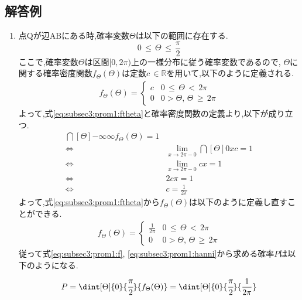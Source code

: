 \documentclass[dvipdfmx,titlepage, 11pt, a4paper]{jsarticle}%
\begin{document}
\newpage

\subsection{解答例}
\begin{enumerate}[(1)]
  \setlength{\itemsep}{10pt}
\item 点$\mathrm{Q}$が辺$\mathrm{AB}$にある時,確率変数$\Theta$は以下の範囲に存在する.
  \begin{equation}
    0\, \leq\, \Theta\, \leq\, \frac{\pi}{2}\label{eq:subsec3:prom1:hanni}
  \end{equation}
  ここで,確率変数$\Theta$は区間$[0, 2\pi)$上の一様分布に従う確率変数であるので,
  $\Theta$に関する確率密度関数$f_{\Theta}(\Theta)$は定数$c\, \in \mathbb{R}$を用いて,以下のように定義される.
  \begin{align}
    f_{\Theta}(\Theta) = 
    \begin{cases}
      c & 0\, \leq\, \Theta\, <\, 2\pi\\
      0 & 0 > \Theta,\, \Theta\, \geq\, 2\pi
    \end{cases} \label{eq:subsec3:prom1:ftheta}
  \end{align}
  よって,式\eqref{eq:subsec3:prom1:ftheta}と確率密度関数の定義より,以下が成り立つ.
  \begin{align*}
    \dint[\Theta]{-\infty}{\infty}{f_{\Theta}(\Theta)} = 1\\
    \Longleftrightarrow\; &\lim_{x \to 2\pi-0}\dint[\Theta]{0}{x}{c} = 1\\
    \Longleftrightarrow\; &\lim_{x \to 2\pi-0}cx = 1\\
    \Longleftrightarrow\; &2c\pi = 1\\
    \Longleftrightarrow\; &c = \frac{1}{2\pi}
  \end{align*}
  よって,式\eqref{eq:subsec3:prom1:ftheta}から$f_{\Theta}(\Theta)$は以下のように定義し直すことができる.
  \begin{align}
    f_{\Theta}(\Theta) = 
    \begin{cases}
      \frac{1}{2\pi} & 0\, \leq\, \Theta\, <\, 2\pi\\
      0 & 0 > \Theta,\, \Theta\, \geq\, 2\pi
    \end{cases}\label{eq:subsec3:prom1:f}
  \end{align}
  従って式\eqref{eq:subsec3:prom1:f}, \eqref{eq:subsec3:prom1:hanni}から求める確率$P$は以下のようになる.
  \begin{align*}
    P &= \dint[\Theta]{0}{\cfrac{\pi}{2}}{f_{\Theta}(\Theta)} = \dint[\Theta]{0}{\cfrac{\pi}{2}}{\frac{1}{2\pi}}\\

\end{align*}
\end{enumerate}
\end{document}
